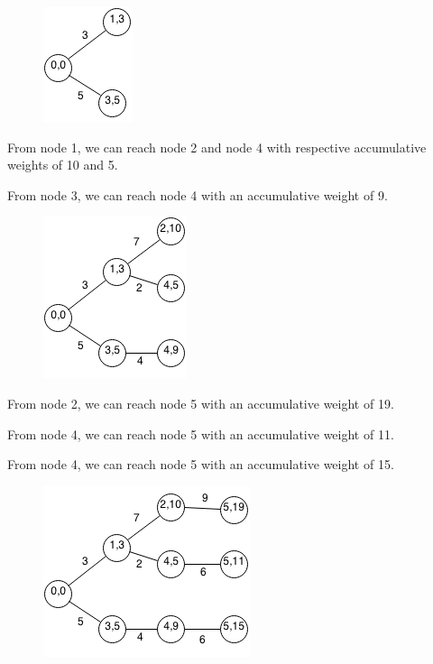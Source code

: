 \documentclass[11pt,oneside]{book}
\makeatletter
\def\maxwidth#1{\ifdim\Gin@nat@width>#1 #1\else\Gin@nat@width\fi}
\makeatother
\begin{document}
\vspace{5px}\begin{figure}[H]\centering
        \includegraphics[width=0.66\maxwidth{\textwidth}]{bellmanford3.png}
        \end{figure}

From node 1, we can reach node 2 and node 4 with respective accumulative weights of 10 and 5.

From node 3, we can reach node 4 with an accumulative weight of 9.

\vspace{5px}\begin{figure}[H]\centering
        \includegraphics[width=0.66\maxwidth{\textwidth}]{bellmanford4.png}
        \end{figure}

From node 2, we can reach node 5 with an accumulative weight of 19.

From node 4, we can reach node 5 with an accumulative weight of 11.

From node 4, we can reach node 5 with an accumulative weight of 15.

\vspace{5px}\begin{figure}[H]\centering
        \includegraphics[width=0.66\maxwidth{\textwidth}]{bellmanford5.png}
        \end{figure}
\end{document}
